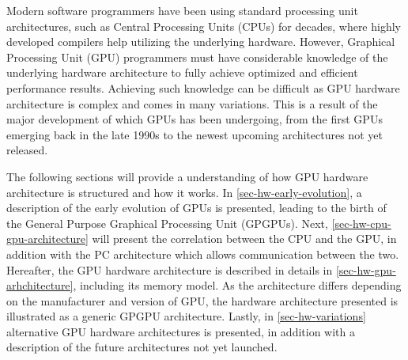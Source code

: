 Modern software programmers have been using standard processing unit architectures, such as Central Processing Units (CPUs) for decades, where highly developed compilers help utilizing the underlying hardware.
However, Graphical Processing Unit (GPU) programmers must have considerable knowledge of the underlying hardware architecture to fully achieve optimized and efficient performance results.
Achieving such knowledge can be difficult as GPU hardware architecture is complex and comes in many variations.
This is a result of the major development of which GPUs has been undergoing, from the first GPUs emerging back in the late 1990s to the newest upcoming architectures not yet released.

The following sections will provide a understanding of how GPU hardware architecture is structured and how it works.
In \cref{sec-hw-early-evolution}, a description of the early evolution of GPUs is presented, leading to the birth of the General Purpose Graphical Processing Unit (GPGPUs).
Next, \cref{sec-hw-cpu-gpu-architecture} will present the correlation between the CPU and the GPU, in addition with the PC architecture which allows communication between the two.
Hereafter, the GPU hardware architecture is described in details in \cref{sec-hw-gpu-arhchitecture}, including its memory model.
As the architecture differs depending on the manufacturer and version of GPU, the hardware architecture presented is illustrated as a generic GPGPU architecture.
Lastly, in \cref{sec-hw-variations} alternative GPU hardware architectures is presented, in addition with a description of the future architectures not yet launched.

 